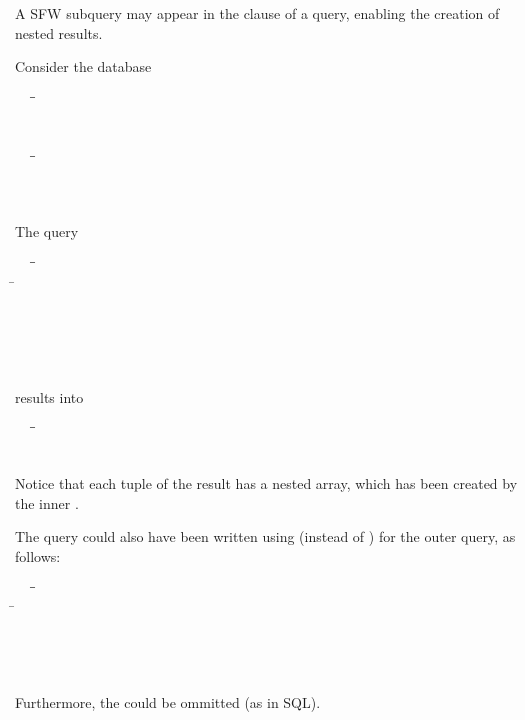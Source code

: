 \begin{example} 
\label{xmpl:nesting-readings}
A SFW subquery may appear in the  clause of a query, enabling
the creation of nested results.  

Consider the database

\begin{tabbing}
\ \ \ \=\gt{sensors : [}\=\\
\>\>\\
\>\>\gt{]}\\
\ \ \ \=\gt{logs: [}\=\\
\>\>\\
\>\>\\
\>\>\gt{]}
\end{tabbing}

The query

\begin{tabbing}
\ \ \ \=\=\\
\>\>\=\\
\>\>\>\\         
\>\>\>\\ 
\>\>\>\gt{)}\\
\>\>\!\!\gt{\}}\\
\>
\end{tabbing}

\noindent results into

\begin{tabbing}
\ \ \ \=\gt{\ob }\=\\
\>\>\\
\>\gt{\cb}
\end{tabbing}

\noindent Notice that each tuple of the result has a nested array, which has
been created by the inner . 

The query could also have been written using  (instead of ) for the outer query, as follows:

\begin{tabbing}
\ \ \ \=\=\\
\>\>\gt{(}\=\\
\>\>\>\\         
\>\>\>\\ 
\>\>\>\\
\>
\end{tabbing}

Furthermore, the  could be ommitted (as in SQL).
\end{example}

